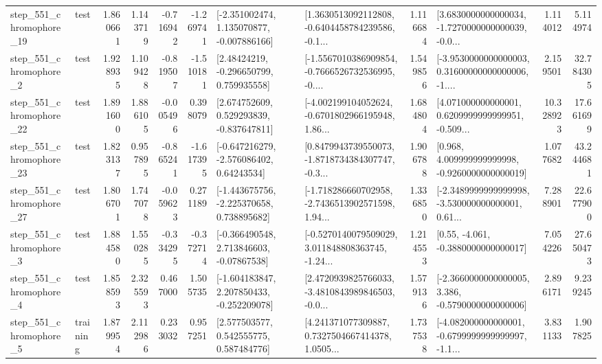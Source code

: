 \begin{tabular}{llrrrrllrlrr}
  step\_551\_chromophore\_19 &      test &      1.860661 &    1.143719 &     -0.716942 & -1.269741 &   [-2.351002474, 1.135070877, -0.007886166] &  [1.3630513092112808, -0.6404458784239586, -0.1... &       1.116684 &  [3.6830000000000034, -1.7270000000000039, -0.0... &            1.114012 &          5.114974 \\
   step\_551\_chromophore\_2 &      test &      1.928935 &    1.109428 &     -0.819507 & -1.510181 &     [2.48424219, -0.296650799, 0.759935558] &  [-1.5567010386909854, -0.7666526732536995, -0.... &       1.549856 &  [-3.9530000000000003, 0.31600000000000006, -1.... &            2.159501 &         32.784305 \\
  step\_551\_chromophore\_22 &      test &      1.891600 &    1.886105 &     -0.005496 &  0.398079 &    [2.674752609, 0.529293839, -0.837647811] &  [-4.002199104052624, -0.6701802966195948, 1.86... &       1.684804 &  [4.071000000000001, 0.6209999999999951, -0.509... &           10.328923 &         17.661699 \\
  step\_551\_chromophore\_23 &      test &      1.823137 &    0.957895 &     -0.865241 & -1.617395 &    [-0.647216279, -2.576086402, 0.64243534] &  [0.8479943739550073, -1.8718734384307747, -0.3... &       1.906788 &    [0.968, 4.009999999999998, -0.9260000000000019] &            1.077682 &         43.244681 \\
  step\_551\_chromophore\_27 &      test &      1.806701 &    1.747078 &     -0.059623 &  0.271189 &   [-1.443675756, -2.225370658, 0.738895682] &  [-1.718286660702958, -2.7436513902571598, 1.94... &       1.336850 &  [-2.3489999999999998, -3.530000000000001, 0.61... &            7.288901 &         22.677900 \\
   step\_551\_chromophore\_3 &      test &      1.884580 &    1.550285 &     -0.334295 & -0.372714 &    [-0.366490548, 2.713846603, -0.07867538] &  [-0.5270140079509029, 3.011848808363745, -1.24... &       1.214553 &                [0.55, -4.061, -0.3880000000000017] &            7.054226 &         27.650473 \\
   step\_551\_chromophore\_4 &      test &      1.858593 &    2.325593 &      0.467000 &  1.505735 &   [-1.604183847, 2.207850433, -0.252209078] &  [2.4720939825766033, -3.4810843989846503, -0.0... &       1.579136 &  [-2.3660000000000005, 3.386, -0.5790000000000006] &            2.896171 &          9.239245 \\
   step\_551\_chromophore\_5 &  training &      1.879954 &    2.112986 &      0.233032 &  0.957251 &     [2.577503577, 0.542555775, 0.587484776] &  [4.241371077309887, 0.7327504667414378, 1.0505... &       1.737538 &  [-4.082000000000001, -0.6799999999999997, -1.1... &            3.831133 &          1.907825 \\

\end{tabular}
